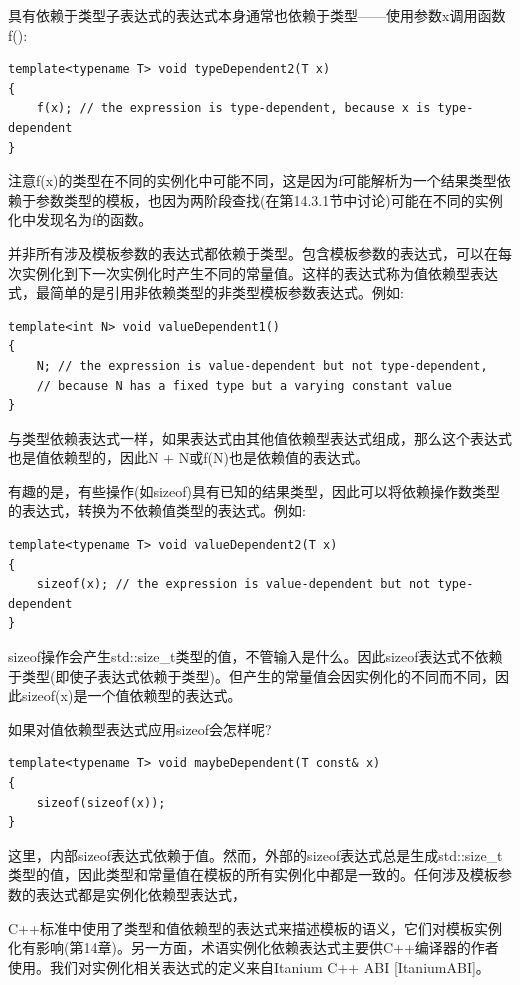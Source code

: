 具有依赖于类型子表达式的表达式本身通常也依赖于类型——使用参数x调用函数f():

\begin{lstlisting}[style=styleCXX]
template<typename T> void typeDependent2(T x)
{
	f(x); // the expression is type-dependent, because x is type-dependent
}
\end{lstlisting}

注意f(x)的类型在不同的实例化中可能不同，这是因为f可能解析为一个结果类型依赖于参数类型的模板，也因为两阶段查找(在第14.3.1节中讨论)可能在不同的实例化中发现名为f的函数。

并非所有涉及模板参数的表达式都依赖于类型。包含模板参数的表达式，可以在每次实例化到下一次实例化时产生不同的常量值。这样的表达式称为值依赖型表达式，最简单的是引用非依赖类型的非类型模板参数表达式。例如:

\begin{lstlisting}[style=styleCXX]
template<int N> void valueDependent1()
{
	N; // the expression is value-dependent but not type-dependent,
	// because N has a fixed type but a varying constant value
}
\end{lstlisting}

与类型依赖表达式一样，如果表达式由其他值依赖型表达式组成，那么这个表达式也是值依赖型的，因此N + N或f(N)也是依赖值的表达式。

有趣的是，有些操作(如sizeof)具有已知的结果类型，因此可以将依赖操作数类型的表达式，转换为不依赖值类型的表达式。例如:

\begin{lstlisting}[style=styleCXX]
template<typename T> void valueDependent2(T x)
{
	sizeof(x); // the expression is value-dependent but not type-dependent
}
\end{lstlisting}

sizeof操作会产生std::size\_t类型的值，不管输入是什么。因此sizeof表达式不依赖于类型(即使子表达式依赖于类型)。但产生的常量值会因实例化的不同而不同，因此sizeof(x)是一个值依赖型的表达式。

如果对值依赖型表达式应用sizeof会怎样呢?

\begin{lstlisting}[style=styleCXX]
template<typename T> void maybeDependent(T const& x)
{
	sizeof(sizeof(x));
}
\end{lstlisting}

这里，内部sizeof表达式依赖于值。然而，外部的sizeof表达式总是生成std::size\_t类型的值，因此类型和常量值在模板的所有实例化中都是一致的。任何涉及模板参数的表达式都是实例化依赖型表达式，

\begin{tcolorbox}[colback=webgreen!5!white,colframe=webgreen!75!black]
\hspace*{0.75cm}C++标准中使用了类型和值依赖型的表达式来描述模板的语义，它们对模板实例化有影响(第14章)。另一方面，术语实例化依赖表达式主要供C++编译器的作者使用。我们对实例化相关表达式的定义来自Itanium C++ ABI [ItaniumABI]。
\end{tcolorbox}

